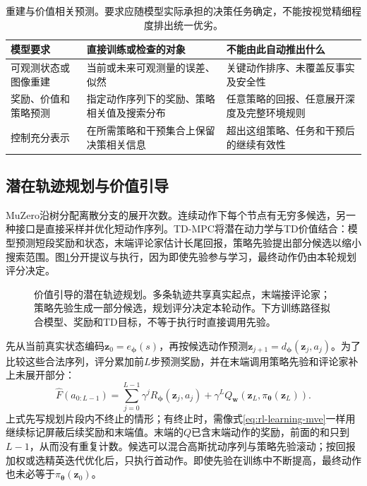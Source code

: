 \begin{table}[t]
  \centering
  \small
  \begin{tabularx}{\linewidth}{>{\raggedright\arraybackslash}p{26mm} >{\raggedright\arraybackslash}X >{\raggedright\arraybackslash}X}
    \toprule
    模型要求 & 直接训练或检查的对象 & 不能由此自动推出什么 \\
    \midrule
    可观测状态或图像重建 & 当前或未来可观测量的误差、似然 & 关键动作排序、未覆盖反事实及安全性 \\
    奖励、价值和策略预测 & 指定动作序列下的奖励、策略相关值及搜索分布 & 任意策略的回报、任意展开深度及完整环境规则 \\
    控制充分表示 & 在所需策略和干预集合上保留决策相关信息 & 超出这组策略、任务和干预后的继续有效性 \\
    \bottomrule
  \end{tabularx}
  \caption{重建与价值相关预测。要求应随模型实际承担的决策任务确定，不能按视觉精细程度排出统一优劣。}
  \label{tab:rl-learning-model-requirements}
\end{table}

\subsection{潜在轨迹规划与价值引导}
\label{sec:rl-learning-tdmpc}

MuZero沿树分配离散分支的展开次数。连续动作下每个节点有无穷多候选，另一种接口是直接采样并优化短动作序列。TD-MPC将潜在动力学与TD价值结合：模型预测短段奖励和状态，末端评论家估计长尾回报，策略先验提出部分候选以缩小搜索范围。图\ref{fig:rl-learning-tdmpc}分开提议与执行，因为即使先验参与学习，最终动作仍由本轮规划评分决定。

\begin{figure}[t]
  \centering
  
  \caption{价值引导的潜在轨迹规划。多条轨迹共享真实起点，末端接评论家；策略先验生成一部分候选，规划评分决定本轮动作。下方训练路径拟合模型、奖励和TD目标，不等于执行时直接调用先验。}
  \label{fig:rl-learning-tdmpc}
\end{figure}

先从当前真实状态编码$\bm z_0=e_{\bm\phi}(s)$，再按候选动作预测$\bm z_{j+1}=d_{\bm\phi}(\bm z_j,a_j)$。为了比较这些合法序列，评分累加前$L$步预测奖励，并在末端调用策略先验和评论家补上未展开部分：
\[
  \widehat F(a_{0:L-1})
  =\sum_{j=0}^{L-1}\gamma^j R_{\bm\phi}(\bm z_j,a_j)
      +\gamma^L Q_{\bm w}(\bm z_L,\pi_{\bm\theta}(\bm z_L)).
\]
上式先写规划片段内不终止的情形；有终止时，需像式\eqref{eq:rl-learning-mve}一样用继续标记屏蔽后续奖励和末端值。末端的$Q$已含末端动作的奖励，前面的和只到$L-1$，从而没有重复计数。候选可以混合高斯扰动序列与策略先验滚动；按回报加权或选精英迭代优化后，只执行首动作。即使先验在训练中不断提高，最终动作也未必等于$\pi_{\bm\theta}(\bm z_0)$。


